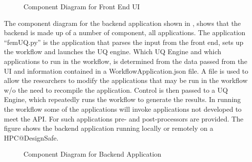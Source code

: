 \begin{figure}[!htbp]
  \caption{Component Diagram for Front End UI}
  \label{fig:componentFront}
\end{figure}

 

The component diagram for the backend application shown in , shows that the backend is made up of a number of component, all applications. The application “femUQ.py” is the application that parses the input from the front end, sets up the workflow and launches the UQ engine. Which UQ Engine and which applications to run in the workflow, is determined from the data passed from the UI and information contained in a WorkflowApplication.json file. A file is used to allow the researchers to modify the applications that may be run in the workflow w/o the need to recompile the application. Control is then passed to a UQ Engine, which repeatedly runs the workflow to generate the results. In running the workflow some of the applications will invoke applications not developed to meet the API. For such applications pre- and post-processors are provided.
The figure shows the backend application running locally or remotely on a HPC@DesignSafe.

 

\begin{figure}[!htbp]
  \caption{Component Diagram for Backend Application}
  \label{fig:componentBackEnd}
\end{figure}
 
